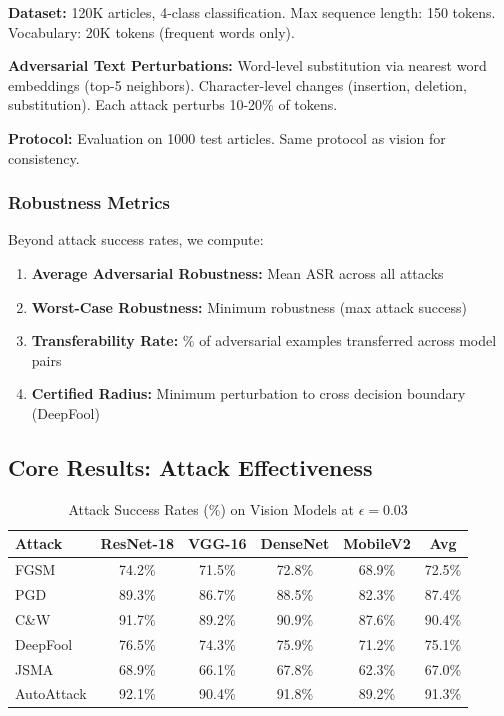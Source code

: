 \documentclass[10pt,conference]{IEEEtran}
\begin{document}
\textbf{Dataset:} 120K articles, 4-class classification. Max sequence length: 150 tokens. Vocabulary: 20K tokens (frequent words only).

\textbf{Adversarial Text Perturbations:} Word-level substitution via nearest word embeddings (top-5 neighbors). Character-level changes (insertion, deletion, substitution). Each attack perturbs 10-20\% of tokens.

\textbf{Protocol:} Evaluation on 1000 test articles. Same protocol as vision for consistency.

\subsubsection{Robustness Metrics}

Beyond attack success rates, we compute:

\begin{enumerate}
\item \textbf{Average Adversarial Robustness:} Mean ASR across all attacks
\item \textbf{Worst-Case Robustness:} Minimum robustness (max attack success)
\item \textbf{Transferability Rate:} \% of adversarial examples transferred across model pairs
\item \textbf{Certified Radius:} Minimum perturbation to cross decision boundary (DeepFool)
\end{enumerate}

\subsection{Core Results: Attack Effectiveness}

\begin{table}[h]
\centering
\caption{Attack Success Rates (\%) on Vision Models at $\epsilon=0.03$}
\footnotesize
\begin{tabular}{lccccc}
\toprule
\textbf{Attack} & \textbf{ResNet-18} & \textbf{VGG-16} & \textbf{DenseNet} & \textbf{MobileV2} & \textbf{Avg} \\
\midrule
FGSM & 74.2\% & 71.5\% & 72.8\% & 68.9\% & 72.5\% \\
PGD & 89.3\% & 86.7\% & 88.5\% & 82.3\% & 87.4\% \\
C\&W & 91.7\% & 89.2\% & 90.9\% & 87.6\% & 90.4\% \\
DeepFool & 76.5\% & 74.3\% & 75.9\% & 71.2\% & 75.1\% \\
JSMA & 68.9\% & 66.1\% & 67.8\% & 62.3\% & 67.0\% \\
AutoAttack & 92.1\% & 90.4\% & 91.8\% & 89.2\% & 91.3\% \\
\bottomrule
\end{tabular}
\label{tab:attack_success}
\end{table}
\FloatBarrier
\end{document}
